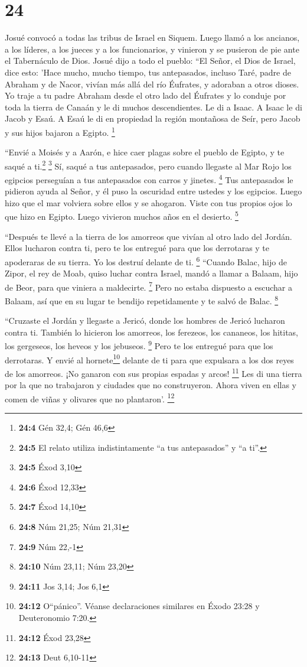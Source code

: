 \hypertarget{section-23}{%
\section{24}\label{section-23}}

 Josué convocó a todas las tribus de Israel en Siquem.
Luego llamó a los ancianos, a los líderes, a los jueces y a los
funcionarios, y vinieron y se pusieron de pie ante el Tabernáculo de
Dios.  Josué dijo a todo el pueblo: ``El Señor, el Dios de
Israel, dice esto: 'Hace mucho, mucho tiempo, tus antepasados, incluso
Taré, padre de Abraham y de Nacor, vivían más allá del río Éufrates, y
adoraban a otros dioses.  Yo traje a tu padre Abraham
desde el otro lado del Éufrates y lo conduje por toda la tierra de
Canaán y le di muchos descendientes. Le di a Isaac.  A
Isaac le di Jacob y Esaú. A Esaú le di en propiedad la región montañosa
de Seír, pero Jacob y sus hijos bajaron a Egipto. \footnote{\textbf{24:4}
  Gén 32,4; Gén 46,6}

 ``Envié a Moisés y a Aarón, e hice caer plagas sobre el
pueblo de Egipto, y te saqué a ti.\footnote{\textbf{24:5} El relato
  utiliza indistintamente ``a tus antepasados'' y ``a ti''.} \footnote{\textbf{24:5}
  Éxod 3,10}  Sí, saqué a tus antepasados, pero cuando
llegaste al Mar Rojo los egipcios perseguían a tus antepasados con
carros y jinetes. \footnote{\textbf{24:6} Éxod 12,33}  Tus
antepasados le pidieron ayuda al Señor, y él puso la oscuridad entre
ustedes y los egipcios. Luego hizo que el mar volviera sobre ellos y se
ahogaron. Viste con tus propios ojos lo que hizo en Egipto. Luego
vivieron muchos años en el desierto. \footnote{\textbf{24:7} Éxod 14,10}

 ``Después te llevé a la tierra de los amorreos que vivían
al otro lado del Jordán. Ellos lucharon contra ti, pero te los entregué
para que los derrotaras y te apoderaras de su tierra. Yo los destruí
delante de ti. \footnote{\textbf{24:8} Núm 21,25; Núm 21,31}
 ``Cuando Balac, hijo de Zipor, el rey de Moab, quiso
luchar contra Israel, mandó a llamar a Balaam, hijo de Beor, para que
viniera a maldecirte. \footnote{\textbf{24:9} Núm 22,-1} 
Pero no estaba dispuesto a escuchar a Balaam, así que en su lugar te
bendijo repetidamente y te salvó de Balac. \footnote{\textbf{24:10} Núm
  23,11; Núm 23,20}

 ``Cruzaste el Jordán y llegaste a Jericó, donde los
hombres de Jericó lucharon contra ti. También lo hicieron los amorreos,
los ferezeos, los cananeos, los hititas, los gergeseos, los heveos y los
jebuseos. \footnote{\textbf{24:11} Jos 3,14; Jos 6,1} 
Pero te los entregué para que los derrotaras. Y envié al
hornete\footnote{\textbf{24:12} O``pánico''. Véanse declaraciones
  similares en Éxodo 23:28 y Deuteronomio 7:20.} delante de ti para que
expulsara a los dos reyes de los amorreos. ¡No ganaron con sus propias
espadas y arcos! \footnote{\textbf{24:12} Éxod 23,28} 
Les di una tierra por la que no trabajaron y ciudades que no
construyeron. Ahora viven en ellas y comen de viñas y olivares que no
plantaron'. \footnote{\textbf{24:13} Deut 6,10-11}

